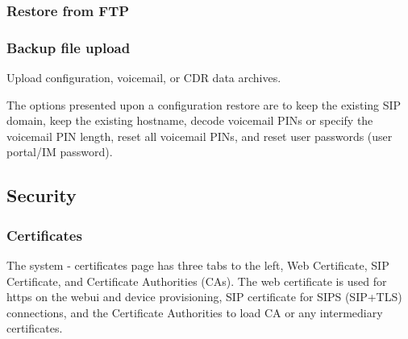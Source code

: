 \documentclass[letterpaper,10pt,english]{sphinxmanual}
\begin{document}
\subsubsection{Restore from FTP}
\label{\detokenize{webui:restore-from-ftp}}\begin{quote}

\end{quote}


\subsubsection{Backup file upload}
\label{\detokenize{webui:backup-file-upload}}
Upload configuration, voicemail, or CDR data archives.
\begin{quote}

\end{quote}

The options presented upon a configuration restore are to keep the existing SIP domain, keep the existing hostname, decode voicemail PINs or specify the voicemail PIN length, reset all voicemail PINs, and reset user passwords (user portal/IM password).
\begin{quote}

\end{quote}


\subsection{Security}
\label{\detokenize{webui:security}}\label{\detokenize{webui:security-tab}}

\subsubsection{Certificates}
\label{\detokenize{webui:certificates}}\label{\detokenize{webui:ssl-certificates}}
The system - certificates page has three tabs to the left, Web Certificate, SIP Certificate, and Certificate Authorities (CAs). The web certificate is used for https on the webui and device provisioning, SIP certificate for SIPS (SIP+TLS) connections, and the Certificate Authorities to load CA or any intermediary certificates.
\end{document}
